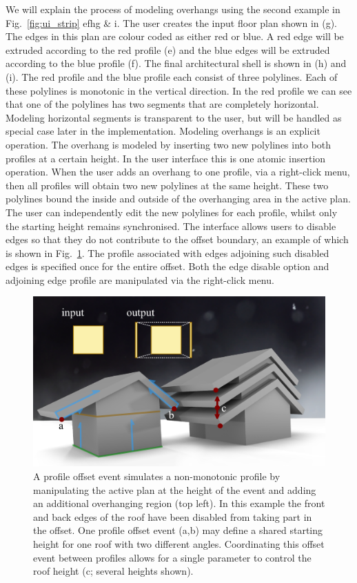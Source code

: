 We will explain the process of modeling overhangs using the second example in Fig.~\ref{fig:ui_strip} efhg \& i. The user creates the input floor plan shown in (g). The edges in this plan are colour coded as either red or blue. A red edge will be extruded according to the red profile (e) and the blue edges will be extruded according to the blue profile (f). The final architectural shell is shown in (h) and (i). The red profile and the blue profile each consist of three polylines. Each of these polylines is monotonic in the vertical direction.
In the red profile we can see that one of the polylines has two segments that are completely horizontal. Modeling horizontal segments is transparent to the user, but will be handled as special case later in the implementation.
Modeling overhangs is an explicit operation. The overhang is modeled by inserting two new polylines into both profiles at a certain height. 
In the user interface this is one atomic insertion operation. When the user adds an overhang to one profile, via a right-click menu, then all profiles will obtain two new polylines at the same height. These two polylines bound the inside and outside of the overhanging area in the active plan. The user can independently edit the new polylines for each profile, whilst only the starting height remains synchronised. The interface allows users to disable edges so that they do not contribute to the offset boundary, an example of which is shown in Fig.~\ref{fig:raising_roof}. The profile associated with edges adjoining such disabled edges is specified once for the entire offset. Both the edge disable option and adjoining edge profile are manipulated via the right-click menu.

\begin{figure}
  \centering
  \includegraphics[width=0.8\columnwidth]{raising_roof.png}
  \caption[A non-monotonic profile]{\label{fig:raising_roof}
A profile offset event simulates a non-monotonic profile by manipulating the active plan at the height of the event and adding an additional overhanging region (top left). In this example the front and back edges of the roof have been disabled from taking part in the offset. One profile offset event (a,b) may define a shared starting height for one roof with two different angles. Coordinating this offset event between profiles allows for a single parameter to control the roof height (c; several heights shown).}
\end{figure}

